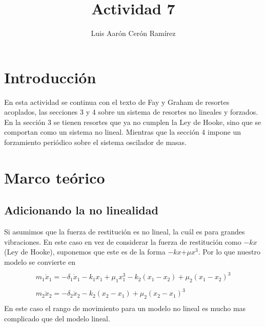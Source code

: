 \documentclass{article}
\title{Actividad 7}
\author{Luis Aarón Cerón Ramírez}
\begin{document}
\maketitle
\section{Introducción}
En esta actividad se continua con el texto de Fay y Graham de resortes acoplados, las secciones 3 y 4 sobre un sistema de resortes no lineales y forzados.
En la sección 3 se tienen resortes que ya no cumplen la Ley de Hooke, sino que se comportan como un sistema no lineal.
Mientras que la sección 4 impone un forzamiento periódico sobre el sistema oscilador de masas.

\section{Marco teórico}
\subsection{Adicionando la no linealidad}
Si asumimos que la fuerza de restitución es no lineal, la cuál es para grandes vibraciones.
\newline
En este caso en vez de considerar la fuerza de restitución como $-kx$ (Ley de Hooke), suponemos que este es de la forma $-kx$+$\mu x^3$. Por lo que nuestro modelo se convierte en
\begin{equation}
\begin{aligned}
\\m_1\ddot x_1= -\delta_1\dot x_1-k_1x_1+\mu_1x_1^{3}-k_2(x_1-x_2)+\mu_2(x_1-x_2)^3\\
\\m_2\ddot x_2= -\delta_2\dot x_2-k_2(x_2-x_1)+\mu_2(x_2-x_1)^3\\
\end{aligned}
\end{equation}
En este caso el rango de movimiento para un modelo no lineal es mucho mas complicado que del modelo lineal.
\end{document}
